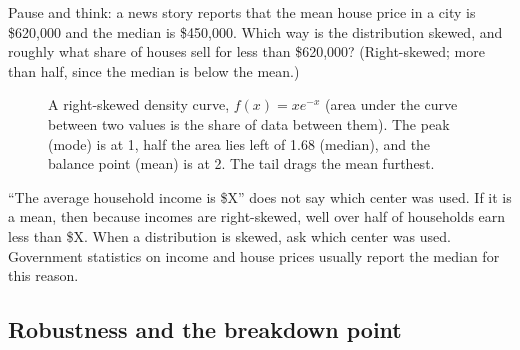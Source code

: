 \begin{recoverybox}
Pause and think: a news story reports that the mean house price in a city is
\$620{,}000 and the median is \$450{,}000. Which way is the distribution skewed, and
roughly what share of houses sell for less than \$620{,}000? (Right-skewed; more than
half, since the median is below the mean.)
\end{recoverybox}

\begin{figure}[H]
\centering
{}
\caption{A right-skewed density curve, $f(x)=xe^{-x}$ (area under the curve between
two values is the share of data between them). The peak
(mode) is at 1, half the area lies left of 1.68 (median), and the balance point
(mean) is at 2. The tail drags the mean furthest.}
\label{fig:center-spread-skew}
\end{figure}

\begin{trapbox}
``The average household income is \$X'' does not say which center was used. If it
is a mean, then because incomes are right-skewed, well over half of households earn
less than \$X. When a distribution is skewed, ask which center was used. Government statistics on
income and house prices usually report the median for this reason.
\end{trapbox}

\subsection{Robustness and the breakdown point}

